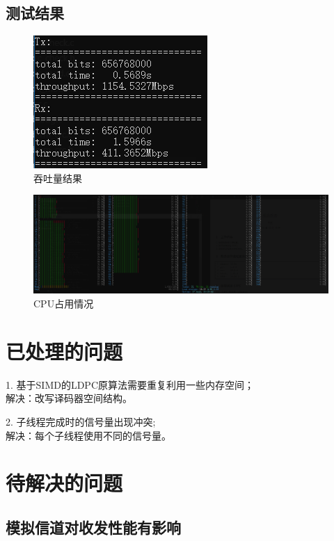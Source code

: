 \documentclass{article}
\begin{document}
\subsection{测试结果}
\begin{figure}[H]
	\centering
	\includegraphics[width = .4\textwidth]{res.png}
	\caption{吞吐量结果}
\end{figure}
\begin{figure}[H]
	\centering
	\includegraphics[width = \textwidth]{cpures.png}
	\caption{CPU占用情况}
\end{figure}

\section{已处理的问题}
1. 基于SIMD的LDPC原算法需要重复利用一些内存空间；\\
解决：改写译码器空间结构。

2. 子线程完成时的信号量出现冲突;\\
解决：每个子线程使用不同的信号量。

\section{待解决的问题}
\subsection{模拟信道对收发性能有影响}
\end{document}

